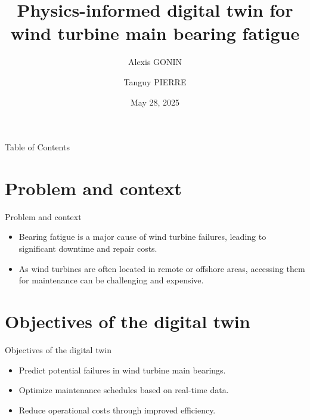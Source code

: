 \documentclass[aspectratio=169,xcolor=dvipsnames]{beamer}
\title{Physics-informed digital twin for wind turbine main bearing fatigue}
\author{Alexis GONIN \and Tanguy PIERRE}
\institute
{
    UFR Maths, Master CSMI \\
}
\date{May 28, 2025} %
\begin{document}
\begin{frame}[plain]
    \vfill
    \centering
    	\titlepage
    \vfill
\end{frame}

\begin{frame}{Table of Contents}
    \tableofcontents
\end{frame}

\section{Problem and context}
\begin{frame}{Problem and context}
    \begin{itemize}
        \item Bearing fatigue is a major cause of wind turbine failures, leading to significant downtime and repair costs.
        \item As wind turbines are often located in remote or offshore areas, accessing them for maintenance can be challenging and expensive.
    \end{itemize}
\end{frame}

\section{Objectives of the digital twin}
\begin{frame}{Objectives of the digital twin}
    \begin{itemize}
        \item Predict potential failures in wind turbine main bearings.
        \item Optimize maintenance schedules based on real-time data.
        \item Reduce operational costs through improved efficiency.
    \end{itemize}
\end{frame}
\end{document}
